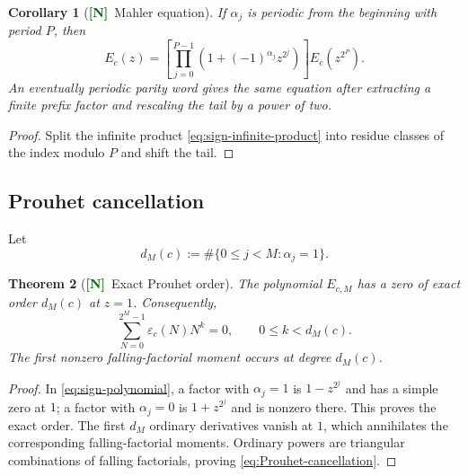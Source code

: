 \documentclass[11pt]{article}
\numberwithin{equation}{section}
\newtheorem{theorem}{Theorem}[section]
\newtheorem{corollary}[theorem]{Corollary}
\theoremstyle{definition}
\theoremstyle{remark}
\newcommand{\New}{\textcolor{darkgreen}{\textsf{\textbf{[N]}}}}
\begin{document}
\begin{corollary}[\New\ Mahler equation]
\label{cor:Mahler-sign}
If $\alpha_j$ is periodic from the beginning with period $P$, then
\begin{equation}
 E_c(z)=
 \left[\prod_{j=0}^{P-1}
 \left(1+(-1)^{\alpha_j}z^{2^j}\right)\right]
 E_c(z^{2^P}).
 \label{eq:Mahler-sign}
\end{equation}
An eventually periodic parity word gives the same equation after extracting a
finite prefix factor and rescaling the tail by a power of two.
\end{corollary}

\begin{proof}
Split the infinite product \eqref{eq:sign-infinite-product} into residue
classes of the index modulo $P$ and shift the tail.
\end{proof}

\subsection{Prouhet cancellation}

Let
\begin{equation}
 d_M(c):=\#\{0\le j<M:\alpha_j=1\}.
 \label{eq:dM}
\end{equation}

\begin{theorem}[\New\ Exact Prouhet order]
\label{thm:Prouhet}
The polynomial $E_{c,M}$ has a zero of exact order $d_M(c)$ at $z=1$.
Consequently,
\begin{equation}
 \sum_{N=0}^{2^M-1}\varepsilon_c(N)N^k=0,
 \qquad 0\le k<d_M(c).
 \label{eq:Prouhet-cancellation}
\end{equation}
The first nonzero falling-factorial moment occurs at degree $d_M(c)$.
\end{theorem}

\begin{proof}
In \eqref{eq:sign-polynomial}, a factor with $\alpha_j=1$ is
$1-z^{2^j}$ and has a simple zero at $1$; a factor with $\alpha_j=0$ is
$1+z^{2^j}$ and is nonzero there.  This proves the exact order.  The first
$d_M$ ordinary derivatives vanish at $1$, which annihilates the corresponding
falling-factorial moments.  Ordinary powers are triangular combinations of
falling factorials, proving \eqref{eq:Prouhet-cancellation}.
\end{proof}
\end{document}
